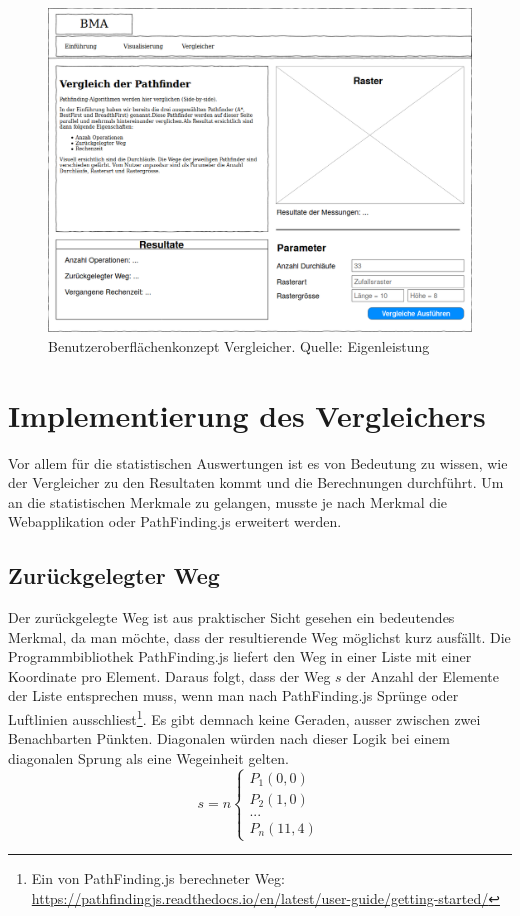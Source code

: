 \documentclass[12pt,a4paper,german]{report}
\begin{document}
\begin{figure}[h]
  \centering
  \includegraphics[width=16cm]{konzept1}
  \caption[Benutzeroberflächenkonzept des Pathfinder-Vergleichers.]{Benutzeroberflächenkonzept Vergleicher. Quelle: Eigenleistung}
  \label{fig:gui_konzept_comparator}
\end{figure}

\section{Implementierung des Vergleichers}
Vor allem für die statistischen Auswertungen ist es von Bedeutung zu wissen, wie der Vergleicher zu den Resultaten kommt und die Berechnungen durchführt. Um an die statistischen Merkmale zu gelangen, musste je nach Merkmal die Webapplikation oder PathFinding.js erweitert werden.

\subsection{Zurückgelegter Weg}
Der zurückgelegte Weg ist aus praktischer Sicht gesehen ein bedeutendes Merkmal, da man möchte, dass der resultierende Weg möglichst kurz ausfällt. 
Die Programmbibliothek PathFinding.js liefert den Weg in einer Liste mit einer Koordinate pro Element. 
Daraus folgt, dass der Weg $s$ der Anzahl der Elemente der Liste entsprechen muss, wenn man nach PathFinding.js Sprünge oder Luftlinien ausschliest\footnote{Ein von PathFinding.js berechneter Weg: \url{https://pathfindingjs.readthedocs.io/en/latest/user-guide/getting-started/}}. 
Es gibt demnach keine Geraden, ausser zwischen zwei Benachbarten Pünkten.
Diagonalen würden nach dieser Logik bei einem diagonalen Sprung als eine Wegeinheit gelten.
\[ s = n
\begin{cases}
  P_1(0,0)\\
  P_2(1,0)\\
  ...\\
  P_n(11,4)
\end{cases}
\]
\end{document}
